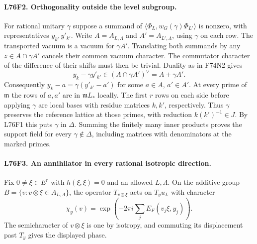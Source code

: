 \paragraph{L76F2. Orthogonality outside the level subgroup.}
For rational unitary $\gamma$ suppose a summand of
$\langle\Phi_L,w_G(\gamma)\Phi_{L'}\rangle$ is nonzero, with
representatives $y_k,y'_{k'}$. Write $A=A_{L,\Lambda}$ and
$A'=A_{L',\Lambda}$, using $\gamma$ on each row. The transported
vacuum is a vacuum for $\gamma A'$. Translating both summands by
any $z\in A\cap\gamma A'$ cancels their common vacuum character.
The commutator character of the difference of their shifts must
then be trivial. Duality as in F74N2 gives
\[
 y_k-\gamma y'_{k'}\in(A\cap\gamma A')^\vee=A+\gamma A'.
\]
Consequently $y_k-a=\gamma(y'_{k'}-a')$ for some $a\in A$,
$a'\in A'$. At every prime of $\mathfrak m$ the rows of $a,a'$
are in $\mathfrak m L_*$ locally. The first $r$ rows on each
side before applying $\gamma$ are local bases with residue
matrices $k,k'$, respectively. Thus $\gamma$ preserves the
reference lattice at those primes, with reduction $k(k')^{-1}\in J$.
By L76F1 this puts $\gamma$ in $\Delta$. Summing the finitely
many inner products proves the support field for every
$\gamma\notin\Delta$, including matrices with denominators at
the marked primes.

\paragraph{L76F3. An annihilator in every rational isotropic direction.}
Fix $0\ne\xi\in E^r$ with $h(\xi,\xi)=0$ and an allowed $L,\Lambda$.
On the additive group $B=\{v:v\otimes\xi\in A_{L,\Lambda}\}$,
the operator $T_{v\otimes\xi}$ acts on $T_yu_L$ with character
\[
  \chi_y(v)=\exp\!\left(-2\pi i\sum_j E_F(v_j\xi,y_j)\right).
\]
The semicharacter of $v\otimes\xi$ is one by isotropy, and
commuting its displacement past $T_y$ gives the displayed phase.

